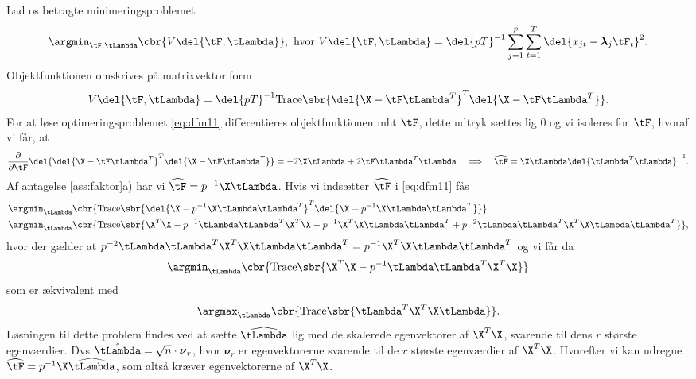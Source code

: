 Lad os betragte minimeringsproblemet
\begin{align}
\argmin_{\tF, \tLambda} \cbr{V \del{\tF, \tLambda}}, \text{ hvor } V \del{\tF, \tLambda} = \del{pT}^{-1} \sum_{j=1}^p \sum_{t=1}^T \del{x_{jt} - \boldsymbol{\lambda}_j \tF_t}^2.  \label{eq:dfm11}
\end{align}
Objektfunktionen omskrives på matrixvektor form
\begin{align*}
V \del{\tF, \tLambda} = \del{pT}^{-1} \text{Trace} \sbr{ \del{\X - \tF \tLambda^T}^T \del{\X - \tF \tLambda^T}}.
\end{align*}
For at løse optimeringsproblemet \eqref{eq:dfm11} differentieres objektfunktionen mht \(\tF\), dette udtryk sættes lig 0 og vi isoleres for \(\tF\), hvoraf vi får, at
\begin{align*}
\frac{\partial}{\partial \tF} \del{\del{\X - \tF \tLambda^T}^T \del{\X - \tF \tLambda^T}} = -2 \X \tLambda + 2 \tF \tLambda^T \tLambda \quad \Longrightarrow \quad \widehat{\tF} = \X \tLambda \del{\tLambda^T \tLambda}^{-1} .
\end{align*}
Af antagelse \ref{ass:faktor}a) har vi  \(\widehat{\tF} = p^{-1} \X \tLambda\).
Hvis vi indsætter \(\widehat{\tF}\) i \eqref{eq:dfm11} fås
\begin{align*}
&\argmin_{\tLambda} \cbr{\text{Trace} \sbr{ \del{\X - p^{-1} \X \tLambda \tLambda^T}^T \del{\X - p^{-1} \X \tLambda \tLambda^T}}} \\
&\argmin_{\tLambda} \cbr{ \text{Trace} \sbr{\X^T \X - p^{-1} \tLambda \tLambda^T \X^T \X - p^{-1} \X^T \X \tLambda \tLambda^T + p^{-2} \tLambda \tLambda^T \X^T \X \tLambda \tLambda^T}},
\end{align*}
hvor der gælder at \(p^{-2} \tLambda \tLambda^T \X^T \X \tLambda \tLambda^T = p^{-1} \X^T \X \tLambda \tLambda^T\) og vi får da
\begin{align*}
\argmin_{\tLambda} \cbr{ \text{Trace} \sbr{\X^T \X - p^{-1} \tLambda \tLambda^T \X^T \X}}
\end{align*}
som er ækvivalent med
\begin{align*}
\argmax_{\tLambda} \cbr{ \text{Trace} \sbr{\tLambda^T \X^T \X \tLambda}}.
\end{align*}
Løsningen til dette problem findes ved at sætte \(\widehat{\tLambda}\) lig med de skalerede egenvektorer af \(\X^T \X\), svarende til dens \(r\) største egenværdier.
Dvs \(\hat{\tLambda} = \sqrt{n} \cdot \boldsymbol{\nu}_r\), hvor \(\boldsymbol{\nu}_r\) er egenvektorerne svarende til de \(r\) største egenværdier af \(\X^T \X\).
Hvorefter vi kan udregne \(\widehat{\tF} = p^{-1} \X \widehat{\tLambda}\), som altså kræver egenvektorerne af \(\X^T \X\).

